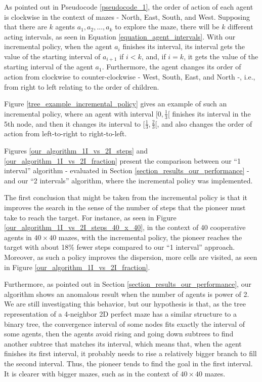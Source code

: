 As pointed out in Pseudocode \ref{pseudocode_1}, the order of action of each agent is clockwise in the context of mazes - North, East, South, and West. Supposing that there are $k$ agents $a_{1}, a_{2},...,a_{k}$ to explore the maze, there will be $k$ different acting intervals, as seen in Equation \ref{equation_agent_intervals}. With our incremental policy, when the agent $a_{i}$ finishes its interval, its interval gets the value of the starting interval of $a_{i+1}$ if $i < k$, and, if $i = k$, it gets the value of the starting interval of the agent $a_{1}$. Furthermore, the agent changes its order of action from clockwise to counter-clockwise - West, South, East, and North -, i.e., from right to left relating to the order of children.

Figure \ref{tree_example_incremental_policy} gives an example of such an incremental policy, where an agent with interval $[0, \frac{1}{3}[$ finishes its interval in the 5th node, and then it changes its interval to $[\frac{1}{3}, \frac{2}{3}[$, and also changes the order of action from left-to-right to right-to-left.

Figures \ref{our_algorithm_1I_vs_2I_steps} and \ref{our_algorithm_1I_vs_2I_fraction} present the comparison between our ``1 interval'' algorithm - evaluated in Section \ref{section_results_our_performance} - and our ``2 intervals'' algorithm, where the incremental policy was implemented.

The first conclusion that might be taken from the incremental policy is that it improves the search in the sense of the number of steps that the pioneer must take to reach the target. For instance, as seen in Figure \ref{our_algorithm_1I_vs_2I_steps_40_x_40}, in the context of 40 cooperative agents in $40 \times 40$ mazes, with the incremental policy, the pioneer reaches the target with about 18\% fewer steps compared to our ``1 interval'' approach. Moreover, as such a policy improves the dispersion, more cells are visited, as seen in Figure \ref{our_algorithm_1I_vs_2I_fraction}.

Furthermore, as pointed out in Section \ref{section_results_our_performance}, our algorithm shows an anomalous result when the number of agents is power of 2. We are still investigating this behavior, but our hypothesis is that, as the tree representation of a 4-neighbor 2D perfect maze has a similar structure to a binary tree, the convergence interval of some nodes fits exactly the interval of some agents, then the agents avoid rising and going down subtrees to find another subtree that matches its interval, which means that, when the agent finishes its first interval, it probably needs to rise a relatively bigger branch to fill the second interval. Thus, the pioneer tends to find the goal in the first interval. It is clearer with bigger mazes, such as in the context of $40 \times 40$ mazes. 

